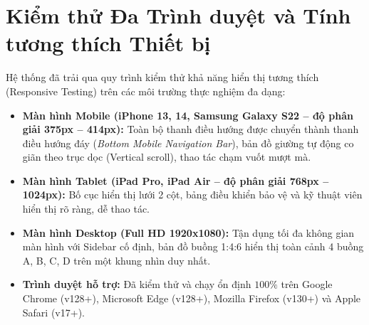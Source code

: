 \section{Kiểm thử Đa Trình duyệt và Tính tương thích Thiết bị}
Hệ thống đã trải qua quy trình kiểm thử khả năng hiển thị tương thích (Responsive Testing) trên các môi trường thực nghiệm đa dạng:
\begin{itemize}
    \item \textbf{Màn hình Mobile (iPhone 13, 14, Samsung Galaxy S22 -- độ phân giải 375px -- 414px):} Toàn bộ thanh điều hướng được chuyển thành thanh điều hướng đáy (\textit{Bottom Mobile Navigation Bar}), bản đồ giường tự động co giãn theo trục dọc (Vertical scroll), thao tác chạm vuốt mượt mà.
    \item \textbf{Màn hình Tablet (iPad Pro, iPad Air -- độ phân giải 768px -- 1024px):} Bố cục hiển thị lưới 2 cột, bảng điều khiển bảo vệ và kỹ thuật viên hiển thị rõ ràng, dễ thao tác.
    \item \textbf{Màn hình Desktop (Full HD 1920x1080):} Tận dụng tối đa không gian màn hình với Sidebar cố định, bản đồ buồng 1:4:6 hiển thị toàn cảnh 4 buồng A, B, C, D trên một khung nhìn duy nhất.
    \item \textbf{Trình duyệt hỗ trợ:} Đã kiểm thử và chạy ổn định $100\%$ trên Google Chrome (v128+), Microsoft Edge (v128+), Mozilla Firefox (v130+) và Apple Safari (v17+).
\end{itemize}

